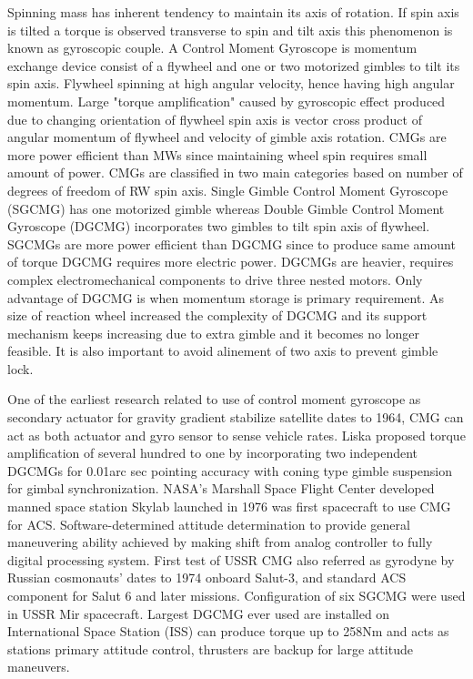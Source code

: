 Spinning mass has inherent tendency to maintain its axis of rotation. If spin axis is tilted a torque is observed transverse to spin and tilt axis this phenomenon is known as gyroscopic couple. A Control Moment Gyroscope is momentum exchange device consist of a flywheel and one or two motorized gimbles to tilt its spin axis. Flywheel spinning at high angular velocity, hence having high angular momentum. Large "torque amplification" caused by gyroscopic effect produced due to changing orientation of flywheel spin axis is vector cross product of angular momentum of flywheel and velocity of gimble axis rotation.\cite{Leve2015} CMGs are more power efficient than MWs since maintaining wheel spin requires small amount of power. CMGs are classified in two main categories based on number of degrees of freedom of RW spin axis. Single Gimble Control Moment Gyroscope (SGCMG) has one motorized gimble whereas Double Gimble Control Moment Gyroscope (DGCMG) incorporates two gimbles to tilt spin axis of flywheel. SGCMGs are more power efficient than DGCMG since to produce same amount of torque DGCMG requires more electric power. DGCMGs are heavier, requires complex electromechanical components to drive three nested motors. Only advantage of DGCMG is when momentum storage is primary requirement. As size of reaction wheel increased the complexity of DGCMG and its support mechanism keeps increasing due to extra gimble and it becomes no longer feasible. It is also important to avoid alinement of two axis to prevent gimble lock.\cite{ Markley2014} 

One of the earliest research related to use of control moment gyroscope as secondary actuator for gravity gradient stabilize satellite dates to 1964, CMG can act as both actuator and gyro sensor to sense vehicle rates.\cite{Scott1964} Liska proposed torque amplification of several hundred to one by incorporating two independent DGCMGs for 0.01arc sec pointing accuracy with coning type gimble suspension for gimbal synchronization.\cite{Liska1968}
NASA's Marshall Space Flight Center developed manned space station Skylab launched in 1976 was first spacecraft to use CMG for ACS.\cite{SELTZERSM} Software-determined attitude determination to provide general maneuvering ability achieved by making shift from analog controller to fully digital processing system. \cite{Coon1976} First test of USSR CMG also referred as gyrodyne by Russian cosmonauts’ dates to 1974 onboard Salut-3, and standard ACS component for Salut 6 and later missions. Configuration of six SGCMG were used in USSR Mir spacecraft. \cite{Branets1988} Largest DGCMG ever used are installed on International Space Station (ISS) can produce torque up to 258Nm and acts as stations primary attitude control, thrusters are backup for large attitude maneuvers.\cite{Gurrisi2010} 


